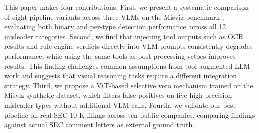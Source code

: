 This paper makes four contributions. First, we present a systematic
comparison of eight pipeline variants across three VLMs on the Misviz
benchmark \cite{tonglet2025misviz}, evaluating both binary and per-type
detection performance across all 12 misleader categories. Second, we
find that injecting tool outputs such as OCR results and rule engine
verdicts directly into VLM prompts consistently degrades performance,
while using the same tools as post-processing vetoes improves results.
This finding challenges common assumptions from tool-augmented LLM work
\cite{yao2023react, schick2023toolformer} and suggests that visual
reasoning tasks require a different integration strategy. Third, we
propose a ViT-based selective veto mechanism \cite{dosovitskiy2021vit}
trained on the Misviz synthetic dataset, which filters false positives
on five high-precision misleader types without additional VLM calls.
Fourth, we validate our best pipeline on real SEC 10-K filings across
ten public companies, comparing findings against actual SEC comment
letters as external ground truth.

